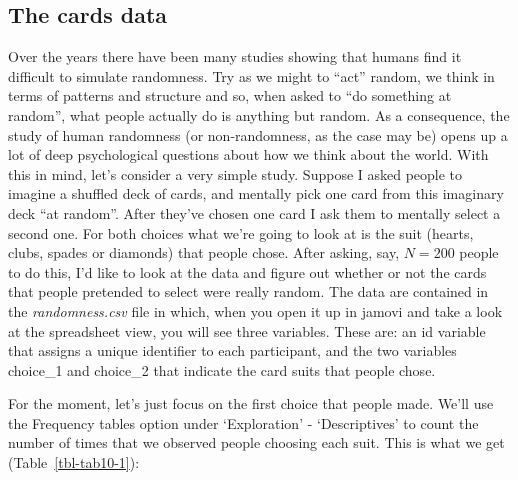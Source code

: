 \documentclass[
  a4paper,
]{book}
\begin{document}
\hypertarget{the-cards-data}{%
\subsection{The cards data}\label{the-cards-data}}

Over the years there have been many studies showing that humans find it
difficult to simulate randomness. Try as we might to ``act'' random, we
think in terms of patterns and structure and so, when asked to ``do
something at random'', what people actually do is anything but random.
As a consequence, the study of human randomness (or non-randomness, as
the case may be) opens up a lot of deep psychological questions about
how we think about the world. With this in mind, let's consider a very
simple study. Suppose I asked people to imagine a shuffled deck of
cards, and mentally pick one card from this imaginary deck ``at
random''. After they've chosen one card I ask them to mentally select a
second one. For both choices what we're going to look at is the suit
(hearts, clubs, spades or diamonds) that people chose. After asking,
say, \(N = 200\) people to do this, I'd like to look at the data and
figure out whether or not the cards that people pretended to select were
really random. The data are contained in the \emph{randomness.csv} file
in which, when you open it up in jamovi and take a look at the
spreadsheet view, you will see three variables. These are: an id
variable that assigns a unique identifier to each participant, and the
two variables choice\_1 and choice\_2 that indicate the card suits that
people chose.

For the moment, let's just focus on the first choice that people made.
We'll use the Frequency tables option under `Exploration' -
`Descriptives' to count the number of times that we observed people
choosing each suit. This is what we get (Table~\ref{tbl-tab10-1}):

\hypertarget{tbl-tab10-1}{}
 
  \providecommand{\huxb}[2]{\arrayrulecolor[RGB]{#1}\global\arrayrulewidth=#2pt}
  \providecommand{\huxvb}[2]{\color[RGB]{#1}\vrule width #2pt}
  \providecommand{\huxtpad}[1]{\rule{0pt}{#1}}
  \providecommand{\huxbpad}[1]{\rule[-#1]{0pt}{#1}}
\end{document}
